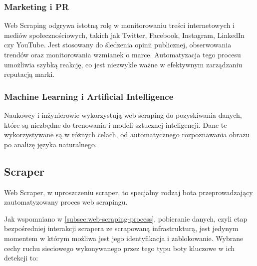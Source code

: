 \subsubsection{Marketing i PR}

Web Scraping odgrywa istotną rolę w monitorowaniu treści internetowych i mediów społecznościowych, takich jak Twitter, Facebook, Instagram, LinkedIn czy YouTube.
Jest stosowany do śledzenia opinii publicznej, obserwowania trendów oraz monitorowania wzmianek o marce.
Automatyzacja tego procesu umożliwia szybką reakcję, co jest niezwykle ważne w efektywnym zarządzaniu reputacją marki\cite{monitoring-social-media}.

\subsubsection{Machine Learning i Artificial Intelligence}

Naukowcy i inżynierowie wykorzystują web scraping do pozyskiwania danych, które są niezbędne do trenowania i modeli sztucznej inteligencji\cite{openai-data-collection}.
Dane te wykorzystywane są w różnych celach, od automatycznego rozpoznawania obrazu po analizę języka naturalnego.

\subsection{Scraper}\label{subsec:scraper}

Web Scraper, w uproszczeniu scraper, to specjalny rodzaj bota przeprowadzający zautomatyzowany proces web scrapingu.

Jak wspomniano w \autoref{subsec:web-scraping-process}, pobieranie danych, czyli etap bezpośredniej interakcji scrapera ze scrapowaną infrastrukturą,
jest jedynym momentem w którym możliwa jest jego identyfikacja i zablokowanie.
Wybrane cechy ruchu sieciowego wykonywanego przez tego typu boty kluczowe w ich detekcji to:

